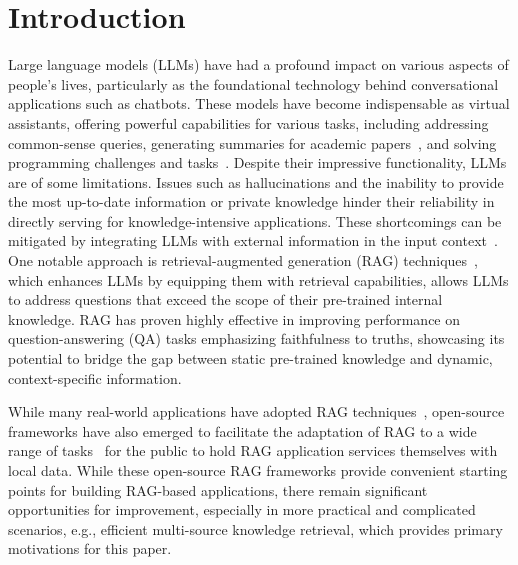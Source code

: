 \section{Introduction}
Large language models (LLMs) have had a profound impact on various aspects of people's lives, particularly as the foundational technology behind conversational applications such as chatbots. 
These models have become indispensable as virtual assistants, offering powerful capabilities for various tasks, including addressing common-sense queries, generating summaries for academic papers~\cite{lin-etal-2024-arxiv}, and solving programming challenges and tasks~\cite{jimenezswe}.  
Despite their impressive functionality, LLMs are of some limitations. 
Issues such as hallucinations and the inability to provide the most up-to-date information or private knowledge hinder their reliability in directly serving for knowledge-intensive applications. 
These shortcomings can be mitigated by integrating LLMs with external information in the input context~\cite{min2022rethinking, wei2022emergent}.
One notable approach is retrieval-augmented generation (RAG) techniques~\cite{izacard2020leveraging, borgeaud2022improving}, which enhances LLMs by equipping them with retrieval capabilities, allows LLMs to address questions that exceed the scope of their pre-trained internal knowledge. 
RAG has proven highly effective in improving performance on question-answering (QA) tasks emphasizing faithfulness to truths, showcasing its potential to bridge the gap between static pre-trained knowledge and dynamic, context-specific information.

While many real-world applications have adopted RAG techniques~\cite{perplexity, kimi}, open-source frameworks have also emerged to facilitate the adaptation of RAG to a wide range of tasks~\cite{llamaindex, langchain} for the public to hold RAG application services themselves with local data. 
While these open-source RAG frameworks provide convenient starting points for building RAG-based applications, there remain significant opportunities for improvement, especially in more practical and complicated scenarios, e.g., efficient multi-source knowledge retrieval, which provides primary motivations for this paper.

